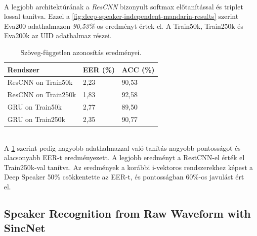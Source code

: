 \newpage
\ \\
A legjobb architektúrának a \emph{ResCNN} bizonyult softmax előtanítással és triplet lossal tanítva. Ezzel a \ref{fig:deep-speaker-independent-mandarin-results} szerint Eva200 adathalmazon \emph{90,53\%}-os eredményt értek el. A Train50k, Train250k és Eva200k az UID adathalmaz részei.

\begin{table}[!ht]
	\begin{tabular}{*3l} \toprule
		\bfseries Rendszer & \bfseries EER (\%) & \bfseries ACC (\%) \\ \midrule
		ResCNN on Train50k & 2,23 & 90,53 \\
		\rowcolor{gray!10} 
		ResCNN on Train250k & 1,83 & 92,58 \\
		GRU on Train50k & 2,77 & 89,50 \\
		\rowcolor{gray!10} 
		GRU on Train250k & 2,35 & 90,77 \\
		\bottomrule
		\hline
	\end{tabular}
	\centering
	\caption{Szöveg-független azonosítás eredményei.}
	\label{fig:deep-speaker-independent}
\end{table}
\ \\
A \ref{fig:deep-speaker-independent} szerint pedig nagyobb adathalmazzal való tanítás nagyobb pontosságot és alacsonyabb EER-t eredményezett. A legjobb eredményt a RestCNN-el érték el Train250k-val tanítva.
\newline
\newline
Az eredmények a korábbi i-vektoros rendszerekhez képest a Deep Speaker 50\% csökkentette az EER-t, és pontosságban 60\%-os javulást ért el.

\subsection{Speaker Recognition from Raw Waveform with SincNet}

